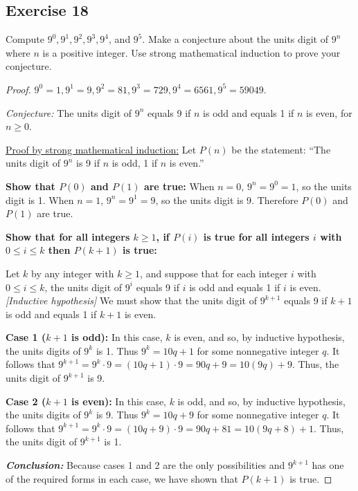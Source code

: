 \documentclass[14pt]{extarticle}
\begin{document}
\subsection{Exercise 18}
Compute $9^0, 9^1, 9^2, 9^3, 9^4$, and $9^5$. Make a conjecture about the units digit of $9^n$ where $n$ is a positive integer. Use strong mathematical induction to prove your conjecture.

\begin{proof}
$9^0 = 1, 9^1 = 9, 9^2 = 81, 9^3 = 729, 9^4 = 6561, 9^5 = 59049$.

{\it Conjecture:} 
The units digit of $9^n$ equals 9 if $n$ is odd and equals 1 if $n$ is even, for $n \geq 0$.

\underline{Proof by strong mathematical induction:} 
Let $P(n)$ be the statement: 
``The units digit of $9^n$ is 9 if $n$ is odd, 1 if $n$ is even.''

{\bf Show that $P(0)$ and $P(1)$ are true:} 
When $n = 0$, $9^n = 9^0 = 1$, so the units digit is 1.
When $n = 1$, $9^n = 9^1 = 9$, so the units digit is 9.
Therefore $P(0)$ and $P(1)$ are true.

{\bf Show that for all integers $k \geq 1$, if $P(i)$ is true for all integers $i$ with $0 \leq i \leq k$ then $P(k+1)$ is true:}

Let $k$ by any integer with $k \geq 1$, and suppose that for each integer $i$ 
with $0 \leq i \leq k$, the units digit of $9^i$ equals 9 if $i$ is odd and 
equals 1 if $i$ is even. {\it [Inductive hypothesis]}
We must show that the units digit of $9^{k+1}$ equals 9 
if $k + 1$ is odd and equals 1 if $k + 1$ is even.

{\bf Case 1 ($k + 1$ is odd):} In this case, $k$ is even, and so, by inductive 
hypothesis, the units digits of $9^k$ is 1.
Thus $9^k = 10q + 1$ for some nonnegative integer $q$. It follows that 
$9^{k+1} = 9^k \cdot 9 = (10q + 1) \cdot 9 = 90q + 9 = 10(9q) + 9$. 
Thus, the units digit of $9^{k+1}$ is 9.

{\bf Case 2 ($k + 1$ is even):} In this case, $k$ is odd, and so, by inductive 
hypothesis, the units digits of $9^k$ is 9. 
Thus $9^k = 10q + 9$ for some nonnegative integer $q$. It follows that 
$9^{k+1} = 9^k \cdot 9 = (10q + 9) \cdot 9 = 90q + 81 = 10(9q + 8) + 1$. 
Thus, the units digit of $9^{k+1}$ is 1.

{\bf\it Conclusion:} Because cases 1 and 2 are the only 
possibilities and $9^{k+1}$ has one of the required forms
in each case, we have shown that $P(k + 1)$ is true.
\end{proof}
\end{document}
